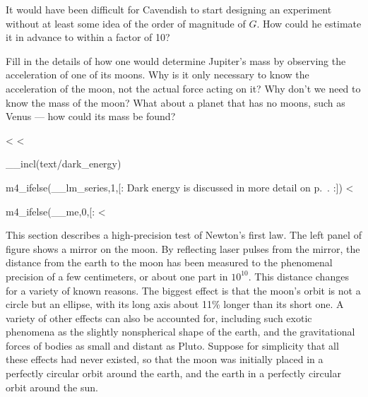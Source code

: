 \startdqs

\begin{dq}
It would have been difficult for Cavendish to start
designing an experiment without at least some idea of the
order of magnitude of $G$.  How could he estimate it in
advance to within a factor of 10?
\end{dq}

\begin{dq}
Fill in the details of how one would determine Jupiter's
mass by observing the acceleration of one of its moons. Why
is it only necessary to know the acceleration of the moon,
not the actual force acting on it? Why don't we need to know
the mass of the moon? What about a planet that has no moons,
such as Venus --- how could its mass be found?
\end{dq}

<%
<%

__incl(text/dark_energy)

\enlargethispage{\baselineskip}

m4_ifelse(__lm_series,1,[:
Dark energy is discussed in more detail on p.~\pageref{subsec:dark-stuff-gr}.
:])
<%

m4_ifelse(__me,0,[:%
<%

This section describes a high-precision test of Newton's first law.
The left panel of figure  shows a mirror on the moon.
By reflecting laser pulses from the mirror, the distance from the earth to
the moon has been measured to the phenomenal precision of a few centimeters, or about one part in $10^{10}$. This distance
changes for a variety of known reasons. The biggest effect is that the moon's orbit is not a circle but an ellipse,
with its long axis about 11\% longer than its short one. A variety of other effects can also be accounted for, including such
exotic phenomena as the slightly nonspherical shape of the earth, and the gravitational forces of bodies as small and distant as Pluto.
Suppose for simplicity that all these effects had never existed, so that the moon was initially placed in a perfectly circular orbit around
the earth, and the earth in a perfectly circular orbit around the sun. 


